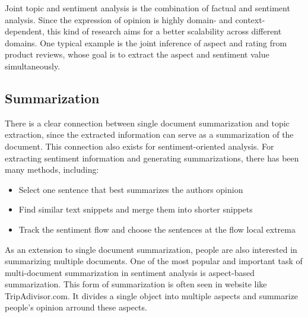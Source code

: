 Joint topic and sentiment analysis is the combination of factual and sentiment analysis. Since the expression of opinion is highly domain- and context-dependent, this kind of research aims for a better scalability across different domains. One typical example is the joint inference of aspect and rating from product reviews, whose goal is to extract the aspect and sentiment value simultaneously.

\subsection{Summarization}

There is a clear connection between single document summarization and topic extraction, since the extracted information can serve as a summarization of the document. This connection also exists for sentiment-oriented analysis. For extracting sentiment information and generating summarizations, there has been many methods, including:
\begin{itemize}
    \item Select one sentence that best summarizes the authors opinion
    \item Find similar text snippets and merge them into shorter snippets
    \item Track the sentiment flow and choose the sentences at the flow local extrema
\end{itemize}

As an extension to single document summarization, people are also interested in summarizing multiple documents. One of the most popular and important task of multi-document summarization in sentiment analysis is aspect-based summarization. This form of summarization is often seen in website like TripAdivisor.com. It divides a single object into multiple aspects and summarize people's opinion arround these aspects.
